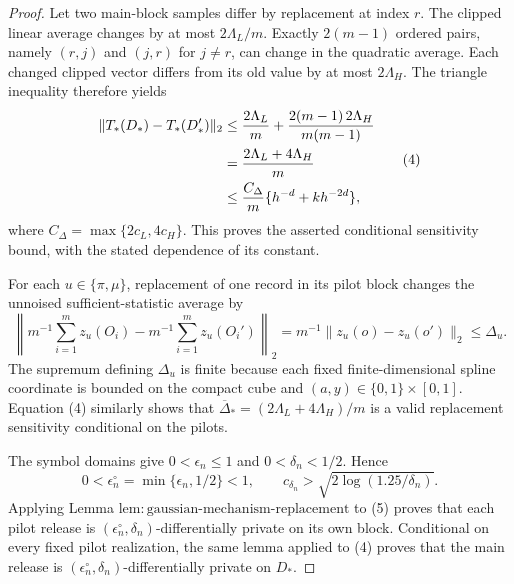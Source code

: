 \documentclass{article}
\begin{document}
\begin{proof}
Let two main-block samples differ by replacement at index \(r\).  The clipped linear average changes by at most \(2\Lambda_L/m\).  Exactly \(2(m-1)\) ordered pairs, namely \((r,j)\) and \((j,r)\) for \(j\ne r\), can change in the quadratic average.  Each changed clipped vector differs from its old value by at most \(2\Lambda_H\).  The triangle inequality therefore yields
\[
 \begin{aligned}
 \|T_*(D_*)-T_*(D_*')\|_2
 &\le {2\Lambda_L\over m}
   +{2(m-1)\,2\Lambda_H\over m(m-1)}\\
 &= {2\Lambda_L+4\Lambda_H\over m}\\
 &\le {C_\Delta\over m}\{h^{-d}+kh^{-2d}\},
 \end{aligned}
\tag{4}
\]
where \(C_\Delta=\max\{2c_L,4c_H\}\).  This proves the asserted conditional sensitivity bound, with the stated dependence of its constant.

For each \(u\in\{\pi,\mu\}\), replacement of one record in its pilot block changes the unnoised sufficient-statistic average by
\[
 \left\|m^{-1}\sum_{i=1}^m z_u(O_i)
       -m^{-1}\sum_{i=1}^m z_u(O_i')\right\|_2
 =m^{-1}\|z_u(o)-z_u(o')\|_2\le\Delta_u.
\tag{5}
\]
The supremum defining \(\Delta_u\) is finite because each fixed finite-dimensional spline coordinate is bounded on the compact cube and \((a,y)\in\{0,1\}\times[0,1]\).  Equation (4) similarly shows that \(\overline\Delta_*=(2\Lambda_L+4\Lambda_H)/m\) is a valid replacement sensitivity conditional on the pilots.

The symbol domains give \(0<\epsilon_n\le1\) and \(0<\delta_n<1/2\).  Hence
\[
 0<\epsilon_n^\circ=\min\{\epsilon_n,1/2\}<1,
 \qquad
 c_{\delta_n}>\sqrt{2\log(1.25/\delta_n)}.
\]
Applying Lemma \(\mathrm{lem{:}gaussian\text{-}mechanism\text{-}replacement}\) to (5) proves that each pilot release is \((\epsilon_n^\circ,\delta_n)\)-differentially private on its own block.  Conditional on every fixed pilot realization, the same lemma applied to (4) proves that the main release is \((\epsilon_n^\circ,\delta_n)\)-differentially private on \(D_*\).


\end{proof}
\end{document}
